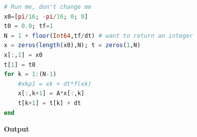 \begin{lstlisting}[language=Julia,style=mystyle]
# Run me, don't change me
x0=[pi/16; -pi/16; 0; 0]
t0 = 0.0; tf=1
N = 1 + floor(Int64,tf/dt) # want to return an integer
x = zeros(length(x0),N); t = zeros(1,N)
x[:,1] = x0
t[1] = t0
for k = 1:(N-1)
    #xkp1 = xk + dt*f(xk)
    x[:,k+1] = A*x[:,k]
    t[k+1] = t[k] + dt
end
\end{lstlisting}
\textbf{Output} 
\begin{figure}[htb!]%
\centering
{}
\hspace{20pt }%
\hspace{20pt }%
\hspace{20pt }%
\subfloat[]{%
     
}
\end{figure}
